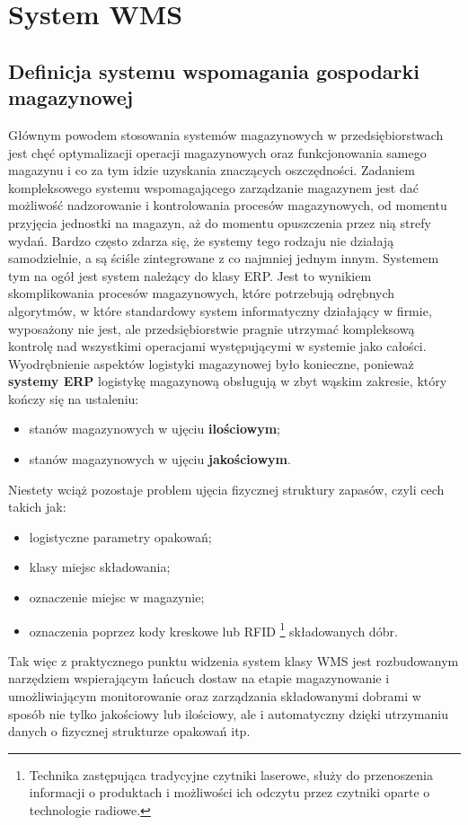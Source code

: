 \chapter{System WMS}
\label{c5:c5}

\section{Definicja systemu wspomagania gospodarki magazynowej}
	Głównym powodem stosowania systemów magazynowych w przedsiębiorstwach jest chęć optymalizacji
	operacji magazynowych oraz funkcjonowania samego magazynu i co za tym idzie uzyskania
	znaczących oszczędności. Zadaniem kompleksowego systemu wspomagającego zarządzanie magazynem jest dać możliwość
	nadzorowanie i kontrolowania procesów magazynowych, od momentu przyjęcia jednostki na magazyn,
	aż do momentu opuszczenia przez nią strefy wydań. Bardzo często zdarza się, że systemy tego rodzaju
	nie działają samodzielnie, a są ściśle zintegrowane z co najmniej jednym innym. Systemem tym na 
	ogół jest system należący do klasy ERP. Jest to wynikiem skomplikowania procesów
	magazynowych, które potrzebują odrębnych algorytmów, w które standardowy system informatyczny 
	działający w firmie, wyposażony nie jest, ale przedsiębiorstwie pragnie utrzymać kompleksową 
	kontrolę nad wszystkimi operacjami występującymi w systemie jako całości.\\
	
	Wyodrębnienie aspektów logistyki magazynowej było konieczne, ponieważ \textbf{systemy ERP}
	logistykę magazynową obsługują w zbyt wąskim zakresie, który kończy się na ustaleniu:
	\begin{itemize}
		\item stanów magazynowych w ujęciu \textbf{ilościowym};
		\item stanów magazynowych w ujęciu \textbf{jakościowym}.
	\end{itemize}
	Niestety wciąż pozostaje problem ujęcia fizycznej struktury zapasów, czyli cech takich jak:
	\begin{itemize}
		\item logistyczne parametry opakowań;
		\item klasy miejsc składowania;
		\item oznaczenie miejsc w magazynie;
		\item oznaczenia poprzez kody kreskowe lub RFID 
			\footnote{Technika zastępująca tradycyjne czytniki laserowe, służy do przenoszenia
			informacji o produktach i możliwości ich odczytu przez czytniki oparte o technologie
			radiowe.} składowanych dóbr.
	\end{itemize}
	Tak więc z praktycznego punktu widzenia system klasy WMS jest rozbudowanym narzędziem
	wspierającym łańcuch dostaw na etapie magazynowanie i umożliwiającym monitorowanie
	oraz zarządzania składowanymi dobrami w sposób nie tylko jakościowy lub ilościowy, ale i
	automatyczny dzięki utrzymaniu danych o fizycznej strukturze opakowań itp. 	
	
